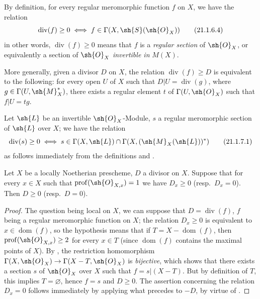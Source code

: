 By definition, for every regular meromorphic function $f$ on $X$, we have the relation
\[
\label{IV.21.1.6.4}
  \operatorname{div}(f)\geq 0 \iff f\in\Gamma(X,\sh{S}(\sh{O}_X))
  \tag{21.1.6.4}
\]
in other words, $\operatorname{div}(f)\geq 0$ means that $f$ is a \emph{regular section} of $\sh{O}_X$, or equivalently a section of $\sh{O}_X$ \emph{invertible in} $M(X)$.

More generally, given a divisor $D$ on $X$, the relation $\operatorname{div}(f)\geq D$ is equivalent to the following: for every open $U$ of $X$ such that $D|U=\operatorname{div}(g)$, where $g\in\Gamma(U,\sh{M}_X^*)$, there exists a regular element $t$ of $\Gamma(U,\sh{O}_X)$ such that $f|U=tg$.

\begin{env}[21.1.7]
\label{IV.21.1.7}
Let $\sh{L}$ be an invertible $\sh{O}_X$-Module, $s$ a regular meromorphic section of $\sh{L}$ over $X$;
we have the relation
\[
\label{IV.21.1.7.1}
  \operatorname{div}(s)\geq 0 \iff s\in\Gamma(X,\sh{L})\cap\Gamma(X,(\sh{M}_X(\sh{L}))^*)
  \tag{21.1.7.1}
\]
as follows immediately from the definitions  and .
\end{env}

\begin{proposition}[21.1.8]
\label{IV.21.1.8}
Let $X$ be a locally Noetherian prescheme, $D$ a divisor on $X$.
Suppose that for every $x\in X$ such that $\operatorname{prof}(\sh{O}_{X,x})=1$ we have $D_x\geq 0$ (resp.\ $D_x=0$).
Then $D\geq 0$ (resp.\ $D=0$).
\end{proposition}

\begin{proof}
The question being local on $X$, we can suppose that $D=\operatorname{div}(f)$, $f$ being a
regular meromorphic function on $X$;
the relation $D_x\geq 0$ is equivalent to $x\in\operatorname{dom}(f)$, so the hypothesis means that if $T=X-\operatorname{dom}(f)$, then $\operatorname{prof}(\sh{O}_{X,x})\geq 2$ for every $x\in T$ (since $\operatorname{dom}(f)$ contains the maximal points of $X$).
By , the restriction homomorphism $\Gamma(X,\sh{O}_X)\to\Gamma(X-T,\sh{O}_X)$ is \emph{bijective}, which shows that there exists a section $s$ of $\sh{O}_X$ over $X$ such that $f=s|(X-T)$.
But by definition of $T$, this implies $T=\varnothing$, hence $f=s$ and $D\geq 0$.
The assertion concerning the relation $D_x=0$ follows immediately by applying what precedes to $-D$, by virtue of .
\end{proof}

